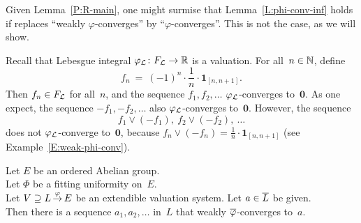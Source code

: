 \documentclass[main.tex]{subfiles}
\begin{document}
%
%
\begin{ex}
\label{E:phi-conv-inf}
Given Lemma~\ref{P:R-main},
one might surmise that Lemma~\ref{L:phi-conv-inf}
holds if replaces ``weakly $\varphi$-converges''
by
``$\varphi$-converges''.
This is not the case, as we will show.

Recall that  Lebesgue integral $\varphi_{\mathcal{L}}\colon F_{\mathcal{L}} \rightarrow \mathbb{R}$
is a valuation.
For all~$n\in \mathbb{N}$, define
\begin{equation*}
f_n \ = \ (-1)^{n} \cdot \textstyle{\frac{1}{n}}\cdot \mathbf{1}_{[n,n+1]}.
\end{equation*}
Then $f_n\in F_{\mathcal{L}}$ for all~$n$, 
and the sequence $f_1,f_2,\dotsc $ $\varphi_{\mathcal{L}}$-converges to~$\mathbf{0}$.
As one expect,
the sequence $-f_1,-f_2,\dotsc$ 
also
 $\varphi_{\mathcal{L}}$-converges to~$\mathbf{0}$.
However, the sequence 
\begin{equation*} 
f_1\vee(-f_1),\  f_2\vee(-f_2),\ \dotsc
\end{equation*}
does not $\varphi_{\mathcal{L}}$-converge to~$\mathbf{0}$,
because $f_n \vee (-f_n) = \frac{1}{n}\cdot \mathbf{1}_{[n,n+1]}$
(see Example~\ref{E:weak-phi-conv}).
\end{ex}
%
%
\begin{lem}
\label{L:fitting-phi-conv-dense}
Let $E$ be an ordered Abelian group.\\
Let $\Phi$ be a fitting uniformity on~$E$.\\
Let $V \supseteq L\,\smash{\stackrel{\varphi}{\rightarrow}}\,E$ be an extendible valuation system.
Let $a\in \overline L$ be given.\\
Then there is a sequence
$a_1,a_2,\dotsc$ in~$L$
that weakly $\overline\varphi$-converges to~$a$.
\end{lem}
\end{document}
